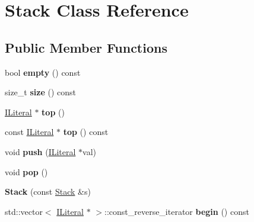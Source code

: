 \hypertarget{class_stack}{}\section{Stack Class Reference}
\label{class_stack}
\subsection*{Public Member Functions}
\begin{DoxyCompactItemize}
\item 
bool {\bfseries empty} () const \hypertarget{class_stack_a2bd88c7b8faf901f4830ed616bf6478f}{}\label{class_stack_a2bd88c7b8faf901f4830ed616bf6478f}

\item 
size\+\_\+t {\bfseries size} () const \hypertarget{class_stack_a3f3772679c16de93eae9eb92e2b85955}{}\label{class_stack_a3f3772679c16de93eae9eb92e2b85955}

\item 
\hyperlink{class_i_literal}{I\+Literal} $\ast$ {\bfseries top} ()\hypertarget{class_stack_a2681a3feae3c2f8758b71a5a989cac6f}{}\label{class_stack_a2681a3feae3c2f8758b71a5a989cac6f}

\item 
const \hyperlink{class_i_literal}{I\+Literal} $\ast$ {\bfseries top} () const \hypertarget{class_stack_a66db0577c42d5f6b489740b40c9bda15}{}\label{class_stack_a66db0577c42d5f6b489740b40c9bda15}

\item 
void {\bfseries push} (\hyperlink{class_i_literal}{I\+Literal} $\ast$val)\hypertarget{class_stack_a1714d79c1261a9a148730627e00c39b9}{}\label{class_stack_a1714d79c1261a9a148730627e00c39b9}

\item 
void {\bfseries pop} ()\hypertarget{class_stack_a09e820f3c3531cf3f401af3b3ca5d56f}{}\label{class_stack_a09e820f3c3531cf3f401af3b3ca5d56f}

\item 
{\bfseries Stack} (const \hyperlink{class_stack}{Stack} \&s)\hypertarget{class_stack_ac0da4dcd9a1ad66f99cea32d26c5d2cf}{}\label{class_stack_ac0da4dcd9a1ad66f99cea32d26c5d2cf}

\item 
std\+::vector$<$ \hyperlink{class_i_literal}{I\+Literal} $\ast$ $>$\+::const\+\_\+reverse\+\_\+iterator {\bfseries begin} () const \hypertarget{class_stack_a4ed2d5a9c9b8c6e3f8dc8daf1a3f10fd}{}\label{class_stack_a4ed2d5a9c9b8c6e3f8dc8daf1a3f10fd}


\end{DoxyCompactItemize}
